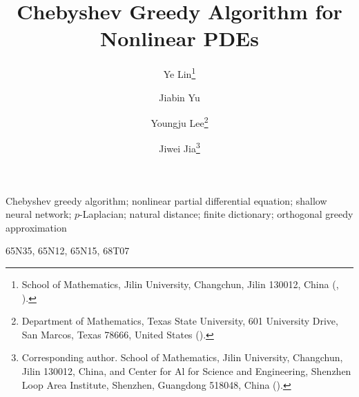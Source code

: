 \documentclass[review,hidelinks,onefignum,onetabnum,nohypdvips]{siamart251216}
\title{Chebyshev Greedy Algorithm for Nonlinear PDEs}
\author{Ye Lin\thanks{\raggedright School of Mathematics, Jilin University, Changchun, Jilin 130012, China (\email{linye2026@jlu.edu.cn}, \email{yujb25@mails.jlu.edu.cn}).}
\and Jiabin Yu\footnotemark[1]
\and Youngju Lee\thanks{\raggedright Department of Mathematics, Texas State University, 601 University Drive, San Marcos, Texas 78666, United States (\email{yjlee@txstate.edu}).}
\and Jiwei Jia\thanks{\raggedright Corresponding author. School of Mathematics, Jilin University, Changchun, Jilin 130012, China, and Center for Al for Science and Engineering, Shenzhen Loop Area Institute, Shenzhen, Guangdong 518048, China (\email{jiajiwei@jlu.edu.cn}).}}
\begin{document}
\maketitle



\begin{keywords}
Chebyshev greedy algorithm; nonlinear partial differential equation; shallow neural network;
$p$-Laplacian; natural distance; finite dictionary; orthogonal greedy approximation
\end{keywords}

\begin{MSCcodes}
65N35, 65N12, 65N15, 68T07
\end{MSCcodes}




\def\CGAChapterFiveEmbedded{1}







\begingroup
\renewcommand{\url}[1]{}

\endgroup
\end{document}
